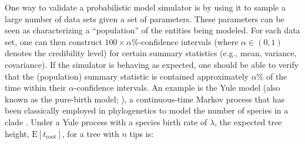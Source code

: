 \documentclass[oneside]{article}
\begin{document}
One way to validate a probabilistic model simulator is by
using it to sample a large number of data sets given a set of parameters.
These parameters can be seen as characterizing a ``population''
of the entities being modeled.
For each data set, one can then construct $100 \times \alpha$\%-confidence intervals
(where $\alpha \in (0,1)$ denotes the credibility level) for
certain summary statistics
(e.g., mean, variance, covariance).
If the simulator is behaving as expected, one should
be able to verify that the (population) summary statistic
is contained approximately $\alpha$\% of the time within their
$\alpha$-confidence intervals.
An example is the Yule model (also known as the pure-birth model;
\citealt{yule24}), a continuous-time Markov process that has been
classically employed in phylogenetics to model the number of
species in a clade \citep{yule24,aldous01}.
Under a Yule process with a species birth rate of $\lambda$, the
expected tree height, $\text{E}[t_{\text{root}}]$, for
a tree with $n$ tips is:

\vspace{.5cm}
\end{document}
